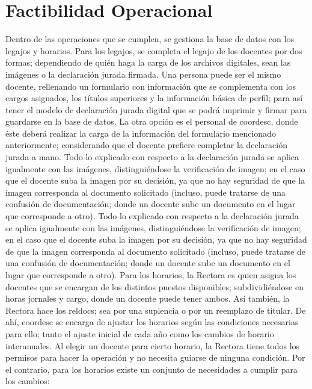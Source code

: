 \section{Factibilidad Operacional}
\normalsize{ \indent
Dentro de las operaciones que se cumplen, se gestiona
la base de datos con los legajos y horarios. Para los
legajos, se completa el legajo de los docentes por dos
formas; dependiendo de quién haga la carga de los archivos
digitales, sean las imágenes o la declaración jurada
firmada. Una persona puede ser el mismo docente,
rellenando un formulario con información que se
complementa con los cargos asignados, los títulos
superiores y la información básica de perfil; para así
tener el modelo de declaración jurada digital que se
podrá imprimir y firmar para guardarse en la base de
datos. La otra opción es el personal de \Gls{coordesc},
donde éste deberá realizar la carga de la información
del formulario mencionado anteriormente; considerando
que el docente prefiere completar la declaración jurada
a mano.
}
\newline
\normalsize{ \indent
Todo lo explicado con respecto a la declaración jurada
se aplica igualmente con las imágenes, distinguiéndose
la verificación de imagen; en el caso que el docente
suba la imagen por su decisión, ya que no hay seguridad
de que la imagen corresponda al documento solicitado
(incluso, puede tratarse de una confusión de documentación;
donde un docente sube un documento en el lugar que
corresponde a otro).
}
\newline
\normalsize{ \indent
Todo lo explicado con respecto a la declaración jurada
se aplica igualmente con las imágenes, distinguiéndose
la verificación de imagen; en el caso que el docente
suba la imagen por su decisión, ya que no hay seguridad
de que la imagen corresponda al documento solicitado
(incluso, puede tratarse de una confusión de documentación;
donde un docente sube un documento en el lugar que
corresponde a otro).
}
\newline
\normalsize{ \indent
Para los horarios, la Rectora es quien asigna los
docentes que se encargan de los distintos puestos
disponibles; subdividiéndose en horas jornales y cargo,
donde un docente puede tener ambos. Así también, la
Rectora hace los \glspl{reldoc}; sea por una suplencia o
por un reemplazo de titular. De ahí, \Gls{coordesc} se
encarga de ajustar los horarios según las condiciones
necesarias para ello; tanto el ajuste inicial de cada
año como los cambios de horario interanuales.
}
\newline
\normalsize{ \indent
Al elegir un docente para cierto horario, la Rectora
tiene todos los permisos para hacer la operación y no
necesita guiarse de ninguna condición. Por el contrario,
para los horarios existe un conjunto de necesidades a
cumplir para los cambios:
}

